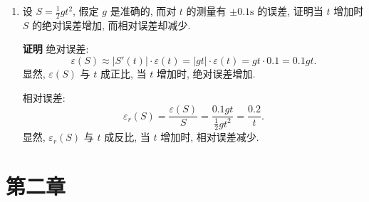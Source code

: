 \documentclass[a4paper,11pt]{ctexart}
\newcommand{\sol}{\par\noindent\textbf{解}\quad}
\newcommand{\proof}{\par\noindent\textbf{证明}\quad}
\begin{document}
\begin{enumerate}[label=\textbf{1-\arabic*.}, leftmargin=*]
    \sol 设正方形边长为 $x$, 面积 $A(x) = x^2$. 
    已知 $x^* \approx 100$, 要求面积的绝对误差 $|\varepsilon(A^*)| \leqslant 1$.
    由绝对误差传播公式 $\varepsilon(A^*) \approx |A'(x^*)| \cdot \varepsilon(x^*)$, 得:
    \[
    2x^* \cdot \varepsilon(x^*) \leqslant 1.
    \]
    代入 $x^* = 100$:
    \[
    200 \cdot \varepsilon(x^*) \leqslant 1 \implies \varepsilon(x^*) \leqslant \frac{1}{200} = 0.005 \text{ cm}.
    \]
    即测量边长的误差限不能超过 $0.005 \text{ cm}$.

    \item[10.] 设 $S = \frac{1}{2}gt^2$, 假定 $g$ 是准确的, 而对 $t$ 的测量有 $\pm 0.1\text{s}$ 的误差, 证明当 $t$ 增加时 $S$ 的绝对误差增加, 而相对误差却减少.
    
    \proof 
    绝对误差:
    \[
    \varepsilon(S) \approx |S'(t)| \cdot \varepsilon(t) = |gt| \cdot \varepsilon(t) = g t \cdot 0.1 = 0.1gt.
    \]
    显然, $\varepsilon(S)$ 与 $t$ 成正比, 当 $t$ 增加时, 绝对误差增加.
    
    相对误差:
    \[
    \varepsilon_r(S) = \frac{\varepsilon(S)}{S} = \frac{0.1gt}{\frac{1}{2}gt^2} = \frac{0.2}{t}.
    \]
    显然, $\varepsilon_r(S)$ 与 $t$ 成反比, 当 $t$ 增加时, 相对误差减少.
\end{enumerate}

\section*{第二章}
\end{document}
